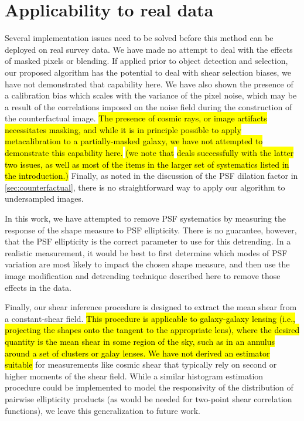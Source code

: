 \documentclass[iop]{emulateapj}
\begin{document}
\section{Applicability to real data}
\label{sec:appplicability}
Several implementation issues need to be solved before this method can
be deployed on real survey data. We have made no attempt to deal with
the effects of masked pixels or blending.  If applied prior to object
detection and selection, our proposed algorithm has the potential to
deal with shear selection biases, we have not demonstrated that
capability here. We have also shown the presence of a calibration bias
which scales with the variance of the pixel noise, which may be a
result of the correlations imposed on the noise field during the
construction of the counterfactual image. \hl{The presence of cosmic
  rays, or image artifacts necessitates masking, and while it is in
  principle possible to apply metacalibration to a partially-masked
  galaxy, we have not attempted to demonstrate this capability here.}
\hl{(we note that} \citealt{metacalII} \hl{ deals successfully with
  the latter two issues, as well as most of the items in the larger
  set of systematics listed in the introduction.)} Finally, as noted
in the discussion of the PSF dilation factor in
\ref{sec:counterfactual}, there is no straightforward way to apply our
algorithm to undersampled images.

In this work, we have attempted to remove PSF systematics by measuring
the response of the shape measure to PSF ellipticity. There is no
guarantee, however, that the PSF ellipticity is the correct parameter
to use for this detrending. In a realistic measurement, it would be
best to first determine which modes of PSF variation are most likely
to impact the chosen shape measure, and then use the image
modification and detrending technique described here to remove those
effects in the data.

Finally, our shear inference procedure is designed to extract the mean
shear from a constant-shear field. \hl{This procedure is applicable to
galaxy-galaxy lensing (i.e., projecting the shapes onto the tangent to
the appropriate lens), where the desired quantity is the mean shear in
some region of the sky, such as in an annulus around a set of clusters
or galay lenses. We have not derived an estimator suitable} for
measurements like cosmic shear that typically rely on second or higher
moments of the shear field. While a similar histogram estimation
procedure could be implemented to model the responsivity of the
distribution of pairwise ellipticity products (as would be needed for
two-point shear correlation functions), we leave this generalization
to future work.
\end{document}
